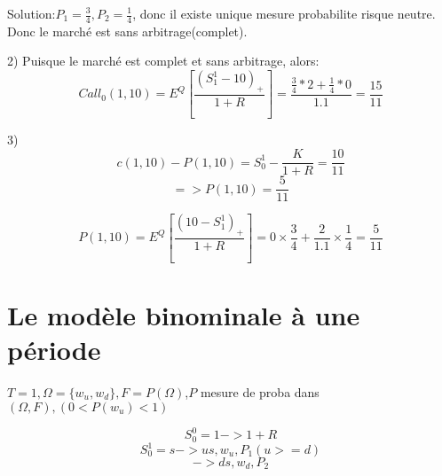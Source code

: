 \documentclass{article}
\begin{document}
Solution:$P_1=\frac{3}{4}, P_2=\frac{1}{4}$, donc il existe unique mesure probabilite risque neutre. Donc le march\'e est sans arbitrage(complet).

2) Puisque le march\'e est complet et sans arbitrage, alors:
\begin{equation}
Call_0(1,10) = E^Q[\frac{(S_1^1-10)_+}{1+R}]=\frac{\frac{3}{4}*2+\frac{1}{4}*0}{1.1}=\frac{15}{11}
\end{equation}

3) 
\begin{equation}
c(1,10)-P(1,10)=S_0^1-\frac{K}{1+R}=\frac{10}{11}
\end{equation}
\begin{equation}
=>P(1,10)=\frac{5}{11}
\end{equation}

\begin{equation}
P(1,10) = E^Q[\frac{(10-S_1^1)_+}{1+R}]=0\times\frac{3}{4}+\frac{2}{1.1}\times\frac{1}{4}=\frac{5}{11}
\end{equation}

\section{Le mod\`ele binominale \`a une p\'eriode}

$T=1,\Omega=\{w_u,w_d\},F=P(\Omega)$,$P$ mesure de proba dans $(\Omega,F),(0<P(w_u)<1)$

\begin{equation}
S_0^0=1->1+R
\end{equation}
\begin{equation}
S_0^1=s->us, w_u,P_1(u>=d)
\end{equation}
\begin{equation}
->ds, w_d, P_2
\end{equation}
\end{document}
